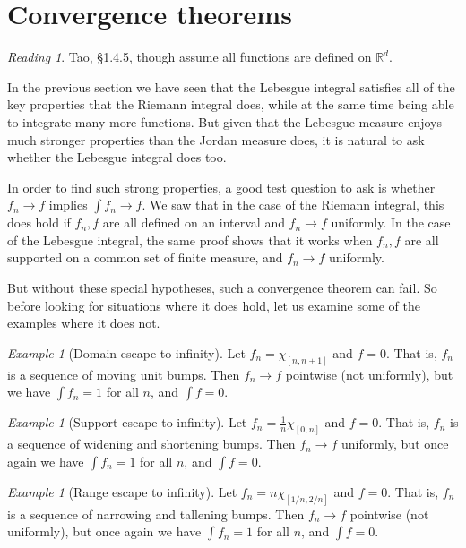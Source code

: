 \documentclass[10pt,oneside]{amsbook}
\newcommand{\RR}{{\mathbb R}}
\theoremstyle{definition}
\theoremstyle{plain}
\theoremstyle{definition}
\theoremstyle{remark}
\newtheorem{example}[thm]{Example}
\newtheorem*{reading}{Reading}
\numberwithin{equation}{section}
\numberwithin{figure}{section}
\begin{document}
\section{Convergence theorems}

\begin{reading}
  Tao, \S 1.4.5, though assume all functions are defined on $\RR^d$.
\end{reading}

In the previous section we have seen that the Lebesgue integral satisfies all of the key properties that the Riemann integral does, while at the same time being able to integrate many more functions. But given that the Lebesgue measure enjoys much stronger properties than the Jordan measure does, it is natural to ask whether the Lebesgue integral does too.

In order to find such strong properties, a good test question to ask is whether $f_n\to f$ implies $\int f_n\to f$. We saw that in the case of the Riemann integral, this does hold if $f_n,f$ are all defined on an interval and $f_n\to f$ uniformly. In the case of the Lebesgue integral, the same proof shows that it works when $f_n,f$ are all supported on a common set of finite measure, and $f_n\to f$ uniformly.

But without these special hypotheses, such a convergence theorem can fail. So before looking for situations where it does hold, let us examine some of the examples where it does not.

\begin{example}[Domain escape to infinity]
  Let $f_n=\chi_{[n,n+1]}$ and $f=0$. That is, $f_n$ is a sequence of moving unit bumps. Then $f_n\to f$ pointwise (not uniformly), but we have $\int f_n=1$ for all $n$, and $\int f=0$.
\end{example}

\begin{example}[Support escape to infinity]
  Let $f_n=\frac1n\chi_{[0,n]}$ and $f=0$. That is, $f_n$ is a sequence of widening and shortening bumps. Then $f_n\to f$ uniformly, but once again we have $\int f_n=1$ for all $n$, and $\int f=0$.
\end{example}

\begin{example}[Range escape to infinity]
  Let $f_n=n\chi_{[1/n,2/n]}$ and $f=0$. That is, $f_n$ is a sequence of narrowing and tallening bumps. Then $f_n\to f$ pointwise (not uniformly), but once again we have $\int f_n=1$ for all $n$, and $\int f=0$.
\end{example}
\end{document}
